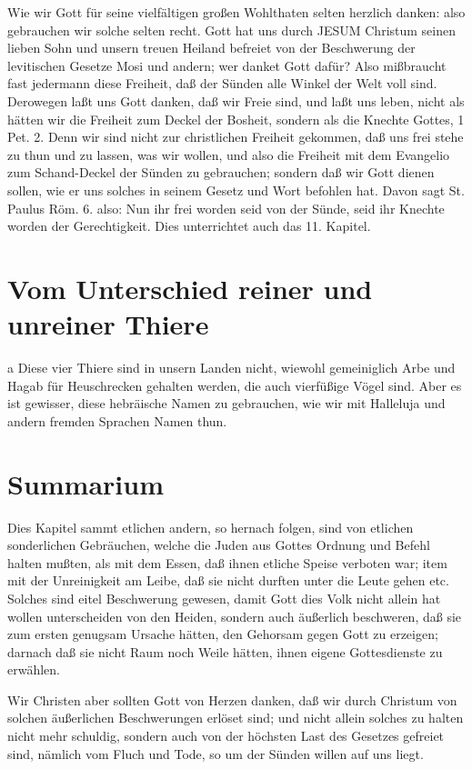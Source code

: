 Wie wir Gott für seine vielfältigen großen Wohlthaten selten herzlich danken: also gebrauchen wir solche selten recht. Gott hat uns durch JESUM Christum seinen lieben Sohn und unsern treuen Heiland befreiet von der Beschwerung der levitischen Gesetze Mosi und andern; wer danket Gott dafür? Also mißbraucht fast jedermann diese Freiheit, daß der Sünden alle Winkel der Welt voll sind. Derowegen laßt uns Gott danken, daß wir Freie sind, und laßt uns leben, nicht als hätten wir die Freiheit zum Deckel der Bosheit, sondern als die Knechte Gottes, 1 Pet. 2. Denn wir sind nicht zur christlichen Freiheit gekommen, daß uns frei stehe zu thun und zu lassen, was wir wollen, und also die Freiheit mit dem Evangelio zum Schand-Deckel der Sünden zu gebrauchen; sondern daß wir Gott dienen sollen, wie er uns solches in seinem Gesetz und Wort befohlen hat. Davon sagt St. Paulus Röm. 6. also: Nun ihr frei worden seid von der Sünde, seid ihr Knechte worden der Gerechtigkeit. Dies unterrichtet auch das 11. Kapitel.

\section{Vom Unterschied reiner und unreiner Thiere}

a Diese vier Thiere sind in unsern Landen nicht, wiewohl gemeiniglich Arbe und Hagab für Heuschrecken gehalten werden, die auch vierfüßige Vögel sind. Aber es ist gewisser, diese hebräische Namen zu gebrauchen, wie wir mit Halleluja und andern fremden Sprachen Namen thun.

\section{Summarium}

Dies Kapitel sammt etlichen andern, so hernach folgen, sind von etlichen sonderlichen Gebräuchen, welche die Juden aus Gottes Ordnung und Befehl halten mußten, als mit dem Essen, daß ihnen etliche Speise verboten war; item mit der Unreinigkeit am Leibe, daß sie nicht durften unter die Leute gehen etc. Solches sind eitel Beschwerung gewesen, damit Gott dies Volk nicht allein hat wollen unterscheiden von den Heiden, sondern auch äußerlich beschweren, daß sie zum ersten genugsam Ursache hätten, den Gehorsam gegen Gott zu erzeigen; darnach daß sie nicht Raum noch Weile hätten, ihnen eigene Gottesdienste zu erwählen.

Wir Christen aber sollten Gott von Herzen danken, daß wir durch Christum von solchen äußerlichen Beschwerungen erlöset sind; und nicht allein solches zu halten nicht mehr schuldig, sondern auch von der höchsten Last des Gesetzes gefreiet sind, nämlich vom Fluch und Tode, so um der Sünden willen auf uns liegt.


